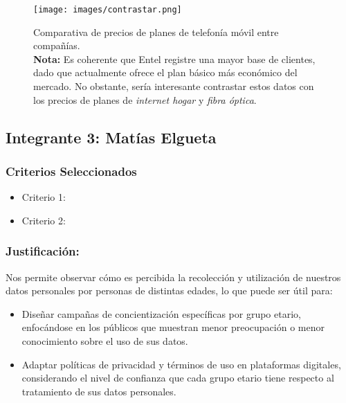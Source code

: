 \documentclass[12pt, a4paper]{article}
\begin{document}
\begin{figure}[H]
    \centering
    \texttt{[image: images/contrastar.png]}
    \caption[Relación precio-plan]{
        Comparativa de precios de planes de telefonía móvil entre compañías. \\
        \textbf{Nota:} Es coherente que Entel registre una mayor base de clientes, dado que actualmente ofrece el plan básico más económico del mercado. No obstante, sería interesante contrastar estos datos con los precios de planes de \textit{internet hogar} y \textit{fibra óptica}.%
    }
    \label{fig:precios_telefonia}
    
   
\end{figure}
\subsection*{Integrante 3: Matías Elgueta}

\subsubsection*{Criterios Seleccionados}
\begin{itemize}
    \item Criterio 1: 
    \item Criterio 2: 
\end{itemize}

\subsubsection*{Justificación:}
Nos permite observar cómo es percibida la recolección y utilización de nuestros datos personales por personas de distintas edades, lo que puede ser útil para:

\begin{itemize}
    \item Diseñar campañas de concientización específicas por grupo etario, enfocándose en los públicos que muestran menor preocupación o menor conocimiento sobre el uso de sus datos.
    \item Adaptar políticas de privacidad y términos de uso en plataformas digitales, considerando el nivel de confianza que cada grupo etario tiene respecto al tratamiento de sus datos personales.
\end{itemize}
\end{document}
